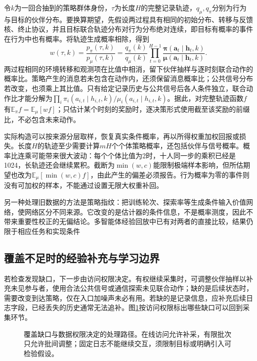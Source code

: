 令$k$为一回合抽到的策略群体身份，$\tau$为长度$H$的完整记录轨迹，$q_\mu,q_\pi$分别为行为与目标的伙伴分布。要换算期望，先假设两过程具有相同的初始分布、转移与反馈核、终止协议，并且目标联合轨迹分布对行为分布绝对连续，即目标有概率的事件在行为中也有概率。将轨迹生成概率相除，得到
\begin{equation}
 w(\tau,k)=\frac{p_\pi(\tau,k)}{p_\mu(\tau,k)}
 =\frac{q_\pi(k)}{q_\mu(k)}
   \prod_{t=0}^{H-1}
   \frac{\bm\pi(\bm a_t\mid\bm h_t,k)}
        {\bm\mu(\bm a_t\mid\bm h_t,k)}.
 \label{eq:rl-multi-agent-is}
\end{equation}
两过程相同的环境转移和观测项在比值中相消，留下伙伴抽样与逐时刻联合动作的概率比。策略产生的消息若未包含在动作内，还须保留消息概率比；公共信号分布若改变，也须乘上其比值。只有给定记录历史与公共信号后各人条件独立，联合动作比才能分解为$\prod_i\pi_i(a_{i,t}\mid h_{i,t},k)/\mu_i(a_{i,t}\mid h_{i,t},k)$。据此，对完整轨迹函数$f$有$\mathbb E_\pi f=\mathbb E_\mu[wf]$；只估计某个时刻的奖励时，逐决策形式使用截至该奖励的前缀比，不必包含未来动作。

实际构造可以按来源分层取样，恢复真实条件概率，再以所得权重加权回报或损失。长度$H$的轨迹至少需要计算$mH$个个体策略概率，还包括伙伴与信号概率。概率比连乘可能带来很大波动：每个个体比值为2时，十人同一步的乘积已经是1024，长轨迹还会继续累积。截断为$\min(w,c)$能限制极端样本影响，但所估期望也改为$\mathbb E_\mu[\min(w,c)f]$，由此产生的偏差必须报告。行为概率为零的事件则没有可加权的样本，不能通过设置无限大权重补回。

另一种处理旧数据的方法是策略指纹：把训练轮次、探索率等生成条件输入价值网络，使网络区分不同来源。它改变的是估计器的条件信息，不是概率测度，因此不带来重要性校正的无偏结论。多智能体经验回放中已有对两者的直接比较，结果仍限于相应任务和实现条件

\subsection{覆盖不足时的经验补充与学习边界}
\label{sec:rl-multi-agent-data-boundary}

若检查发现缺口，下一步由访问权限决定。有权继续采集时，可调整伙伴抽样以补充未见参与者，使用合法公共信号或通信探索未见联合动作；缺的是后续状态时，需要改变到达策略，仅在入口加噪声未必有用。若缺的是记录信息，应补充后续日志字段，已经丢失的历史通常无法追补。图\ref{fig:rl-multi-agent-data-loop}按访问权限标出哪些缺口可以回到采集环节。

\begin{figure}[htbp]
 \centering
 
 \caption{覆盖缺口与数据权限决定的处理路径。在线访问允许补采，有限批次只允许批间调整；固定日志不能继续交互，须限制目标或明确引入可检验假设。}
 \label{fig:rl-multi-agent-data-loop}
\end{figure}

